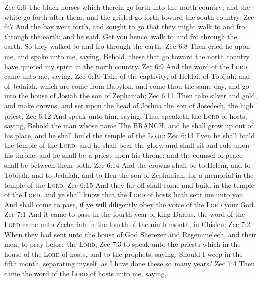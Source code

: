 \vs Zec 6:6 The black horses which  therein go forth into the north country; and the white go forth after them; and the grisled go forth toward the south country.
\vs Zec 6:7 And the bay went forth, and sought to go that they might walk to and fro through the earth: and he said, Get you hence, walk to and fro through the earth. So they walked to and fro through the earth.
\vs Zec 6:8 Then cried he upon me, and spake unto me, saying, Behold, these that go toward the north country have quieted my spirit in the north country.
\vs Zec 6:9 And the word of the \textsc{Lord} came unto me, saying,
\vs Zec 6:10 Take of  the captivity,  of Heldai, of Tobijah, and of Jedaiah, which are come from Babylon, and come thou the same day, and go into the house of Josiah the son of Zephaniah;
\vs Zec 6:11 Then take silver and gold, and make crowns, and set  upon the head of Joshua the son of Josedech, the high priest;
\vs Zec 6:12 And speak unto him, saying, Thus speaketh the \textsc{Lord} of hosts, saying, Behold the man whose name  The BRANCH; and he shall grow up out of his place, and he shall build the temple of the \textsc{Lord}:
\vs Zec 6:13 Even he shall build the temple of the \textsc{Lord}; and he shall bear the glory, and shall sit and rule upon his throne; and he shall be a priest upon his throne: and the counsel of peace shall be between them both.
\vs Zec 6:14 And the crowns shall be to Helem, and to Tobijah, and to Jedaiah, and to Hen the son of Zephaniah, for a memorial in the temple of the \textsc{Lord}.
\vs Zec 6:15 And they  far off shall come and build in the temple of the \textsc{Lord}, and ye shall know that the \textsc{Lord} of hosts hath sent me unto you. And  shall come to pass, if ye will diligently obey the voice of the \textsc{Lord} your God.
\vs Zec 7:1 And it came to pass in the fourth year of king Darius,  the word of the \textsc{Lord} came unto Zechariah in the fourth  of the ninth month,  in Chisleu;
\vs Zec 7:2 When they had sent unto the house of God Sherezer and Regemmelech, and their men, to pray before the \textsc{Lord},
\vs Zec 7:3  to speak unto the priests which  in the house of the \textsc{Lord} of hosts, and to the prophets, saying, Should I weep in the fifth month, separating myself, as I have done these so many years?
\vs Zec 7:4 Then came the word of the \textsc{Lord} of hosts unto me, saying,
